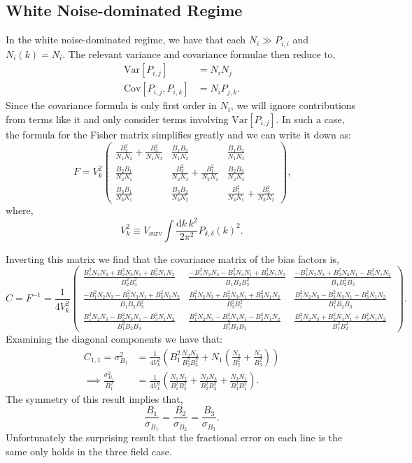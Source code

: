 \documentclass{aastex62}
\newcommand{\beq}{\begin{equation}}
\newcommand{\eeq}{\end{equation}}
\newcommand{\ps}[1]{\ensuremath{P_{#1,#1}}}
\newcommand{\xps}[2]{\ensuremath{P_{#1,#2}}}
\newcommand{\denps}{\ensuremath{P_{\delta,\delta}}}
\newcommand{\Var}[1]{\mathrm{Var}[#1]}
\newcommand{\Cov}[2]{\mathrm{Cov}[#1,#2]}
\begin{document}
\subsection{White Noise-dominated Regime} \label{ssec:tf_noisedom}
In the white noise-dominated regime, we have that each $N_i \gg \ps{i}$ and
$N_i(k) = N_i$. The relevant variance and covariance formulae then reduce to,
\beq\label{eq:var_cov}
\begin{split}
\Var{\xps{i}{j}} &= N_iN_j \\
\Cov{\xps{i}{j}}{\xps{i}{k}} &= N_i\xps{j}{k}\text{.}
\end{split}
\eeq
Since the covariance formula is only first order in $N_i$, we will ignore
contributions from terms like it and only consider terms involving
$\Var{\xps{i}{j}}$. In such a case, the formula for the Fisher matrix
simplifies greatly and we can write it down as:
\beq \label{eq:fmat_tf_exp}
F = V_k^2
\begin{pmatrix}
\frac{B_2^2}{N_1N_2}+\frac{B_3^2}{N_1N_3} & \frac{B_1B_2}{N_1N_2} & \frac{B_1B_3}{N_1N_3} \\
\frac{B_2B_1}{N_2N_1} & \frac{B_3^2}{N_2N_3}+\frac{B_1^2}{N_2N_1} & \frac{B_2B_3}{N_2N_3} \\
\frac{B_3B_1}{N_3N_1} & \frac{B_3B_2}{N_3N_2} & \frac{B_1^2}{N_3N_1}+\frac{B_2^2}{N_3N_2}
\end{pmatrix}
\text{,}
\eeq
where,
\beq \label{eq:Vk}
V_k^2 \equiv V_{\text{surv}} \int \frac{\text{d}k\,k^2}{2\pi^2} \denps(k)^2\text{.}
\eeq

Inverting this matrix we find that the covariance matrix of the bias factors is,
\beq \label{eq:covmat_tf_wn}
C = F^{-1} = \frac{1}{4V_k^2}
\begin{pmatrix}
\frac{B_1^2N_2N_3 + B_2^2N_3N_1 + B_3^2N_1N_2}{B_2^2B_3^2} & \frac{-B_1^2N_2N_3 - B_2^2N_3N_1 + B_3^2N_1N_2}{B_1B_2B_3^2} & \frac{-B_1^2N_2N_3 + B_2^2N_3N_1 - B_3^2N_1N_2}{B_1B_2^2B_3} \\
\frac{-B_1^2N_2N_3 - B_2^2N_3N_1 + B_3^2N_1N_2}{B_1B_2B_3^2} & \frac{B_1^2N_2N_3 + B_2^2N_3N_1 + B_3^2N_1N_2}{B_3^2B_1^2} & \frac{B_1^2N_2N_3 - B_2^2N_3N_1 - B_3^2N_1N_2}{B_1^2B_2B_3} \\
\frac{B_1^2N_2N_3 - B_2^2N_3N_1 - B_3^2N_1N_2}{B_1^2B_2B_3} & \frac{B_1^2N_2N_3 - B_2^2N_3N_1 - B_3^2N_1N_2}{B_1^2B_2B_3} & \frac{B_1^2N_2N_3 + B_2^2N_3N_1 + B_3^2N_1N_2}{B_1^2B_2^2}
\end{pmatrix}
\text{.}
\eeq
Examining the diagonal components we have that:
\beq \label{eq:var_bias_tf_wn}
\begin{split}
C_{1,1} = \sigma_{B_1}^2 &= \frac{1}{4V_k^2} \left( B_1^2 \frac{N_2N_3}{B_2^2B_3^2} + N_1(\frac{N_2}{B_2^2} + \frac{N_3}{B_3^2}) \right) \\
\implies \frac{\sigma_{B_1}^2}{B_1^2} &= \frac{1}{4V_k^2} \left( \frac{N_1N_2}{B_1^2B_2^2} + \frac{N_2N_3}{B_2^2B_3^2} + \frac{N_3N_1}{B_3^2B_1^2} \right)\text{.}
\end{split}
\eeq
The symmetry of this result implies that,
\beq \label{eq:frac_error_same}
\frac{B_1}{\sigma_{B_1}} = \frac{B_2}{\sigma_{B_2}} = 
\frac{B_3}{\sigma_{B_3}} \text{.}
\eeq
Unfortunately the surprising result that the fractional error on each line is
the same only holds in the three field case.
\end{document}
